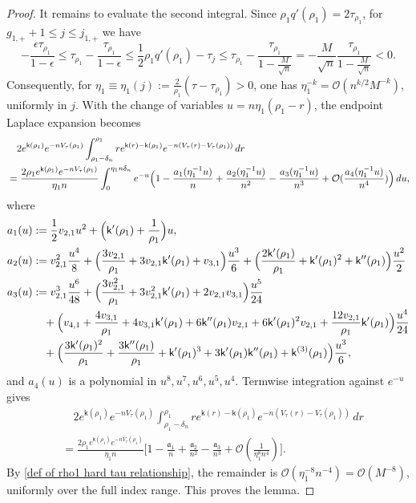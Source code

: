 \documentclass[a4paper]{article}
\numberwithin{equation}{section}
\begin{document}
\begin{proof}
It remains to evaluate the second integral. Since $\rho_1q'(\rho_1)=2\tau_{\rho_1}$, for $g_{1,+}+1\leq j\leq j_{1,+}$ we have
\begin{equation}
\label{def of rho1 hard tau relationship}
-\frac{\epsilon\tau_{\rho_1}}{1-\epsilon}
\leq
\tau_{\rho_1}-\frac{\tau_{\rho_1}}{1-\epsilon}
\leq
\frac{1}{2}\rho_1q'(\rho_1)-\tau_j
\leq \tau_{\rho_1}-\frac{\tau_{\rho_1}}{1-\frac{M}{\sqrt{n}}}
=
-\frac{M}{\sqrt{n}}\frac{\tau_{\rho_1}}{1-\frac{M}{\sqrt{n}}}<0.
\end{equation}
Consequently, for $\eta_1\equiv\eta_1(j):=\frac{2}{\rho_1}(\tau-\tau_{\rho_1})>0$, one has $\eta_1^{-k}=\mathcal{O}(n^{k/2}M^{-k})$, uniformly in $j$. With the change of variables $u=n\eta_1(\rho_1-r)$, the endpoint Laplace expansion becomes
\begin{align*}
&\quad 2e^{\mathsf{k}(\rho_1)}e^{-nV_{\tau}(\rho_1)}\int_{\rho_1-\delta_n}^{\rho_1}re^{\mathsf{k}(r)-\mathsf{k}(\rho_1)}e^{-n(V_{\tau}(r)-V_{\tau}(\rho_1))}\,dr
\\
&=
\frac{2\rho_1e^{\mathsf{k}(\rho_1)}e^{-nV_{\tau}(\rho_1)}}{\eta_1 n}\int_0^{\eta_1n\delta_n}
e^{-u}
\Bigl(1-\frac{a_1(\eta_1^{-1}u)}{n}+\frac{a_2(\eta_1^{-1}u)}{n^2}-\frac{a_3(\eta_1^{-1}u)}{n^3}+\mathcal{O}(\frac{a_4(\eta_1^{-1}u)}{n^4})\Bigr)
\,du,
\end{align*}
where 
\begin{align*}
a_1(u)&:=\frac{1}{2}v_{2,1}u^2+\Bigl(\mathsf{k}'(\rho_1)+\frac{1}{\rho_1}\Bigr)u,
\\
a_2(u)&:=v_{2,1}^2\frac{u^4}{8}+\Bigl(\frac{3v_{2,1}}{\rho_1}+3v_{2,1}\mathsf{k}'(\rho_1)+v_{3,1}\Bigr)\frac{u^3}{6}
+\Bigl(\frac{2\mathsf{k}'(\rho_1)}{\rho_1}+\mathsf{k}'(\rho_1)^2+\mathsf{k}''(\rho_1)\Bigr)\frac{u^2}{2}
\\
a_3(u)&:=v_{2,1}^3\frac{u^6}{48}
+\Bigl(\frac{3v_{2,1}^2}{\rho_1}+3v_{2,1}^2\mathsf{k}'(\rho_1)+2v_{2,1}v_{3,1}\Bigr)\frac{u^5}{24}
\\
&\quad
+\Bigl(v_{4,1}+\frac{4v_{3,1}}{\rho_1}+4v_{3,1}\mathsf{k}'(\rho_1)+6\mathsf{k}''(\rho_1)v_{2,1}+6\mathsf{k}'(\rho_1)^2v_{2,1}+\frac{12v_{2,1}}{\rho_1}\mathsf{k}'(\rho_1)\Bigr)\frac{u^4}{24}
\\
&\quad
+\Bigl(\frac{3\mathsf{k}'(\rho_1)^2}{\rho_1}+\frac{3\mathsf{k}''(\rho_1)}{\rho_1}+\mathsf{k}'(\rho_1)^3+3\mathsf{k}'(\rho_1)\mathsf{k}''(\rho_1)+\mathsf{k}^{(3)}(\rho_1)\Bigr)
\frac{u^3}{6},
\end{align*}
and $a_4(u)$ is a polynomial in $u^8,u^7,u^6,u^5,u^4$. Termwise integration against $e^{-u}$ gives
\begin{align*}
&\quad 2e^{\mathsf{k}(\rho_1)}e^{-nV_{\tau}(\rho_1)}\int_{\rho_1-\delta_n}^{\rho_1}re^{\mathsf{k}(r)-\mathsf{k}(\rho_1)}e^{-n(V_{\tau}(r)-V_{\tau}(\rho_1))}\,dr
\\
&=
\frac{2\rho_1e^{\mathsf{k}(\rho_1)}e^{-nV_{\tau}(\rho_1)}}{\eta_1 n}
\bigg[1-\frac{\mathfrak{a}_1}{n}+\frac{\mathfrak{a}_2}{n^2}-\frac{\mathfrak{a}_3}{n^3}+\mathcal{O}(\frac{1}{\eta_1^8n^4})\bigg]. 
\end{align*}
By \eqref{def of rho1 hard tau relationship}, the remainder is $\mathcal{O}(\eta_1^{-8}n^{-4})=\mathcal{O}(M^{-8})$, uniformly over the full index range. This proves the lemma.



\end{proof}
\end{document}
